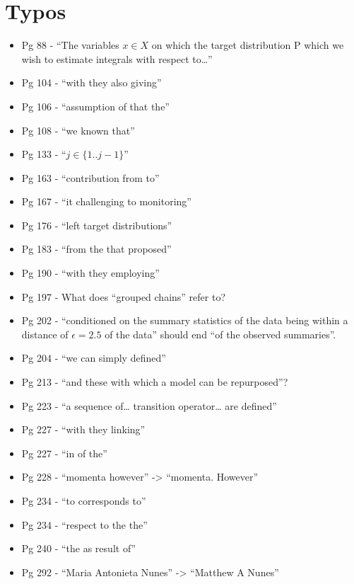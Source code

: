 \documentclass[]{article}
\providecommand{\tightlist}{%
  \setlength{\itemsep}{0pt}\setlength{\parskip}{0pt}}
\begin{document}
\section{Typos}\label{typos}

\begin{itemize}
\tightlist
\item
  Pg 88 - ``The variables \(x \in X\) on which the target distribution P
  which we wish to estimate integrals with respect to\ldots{}''
\item
  Pg 104 - ``with they also giving''
\item
  Pg 106 - ``assumption of that the''
\item
  Pg 108 - ``we known that''
\item
  Pg 133 - ``\(j \in \{1..j-1\}\)''
\item
  Pg 163 - ``contribution from to''
\item
  Pg 167 - ``it challenging to monitoring''
\item
  Pg 176 - ``left target distributions''
\item
  Pg 183 - ``from the that proposed''
\item
  Pg 190 - ``with they employing''
\item
  Pg 197 - What does ``grouped chains'' refer to?
\item
  Pg 202 - ``conditioned on the summary statistics of the data being
  within a distance of \(\epsilon=2.5\) of the data'' should end ``of
  the observed summaries''.
\item
  Pg 204 - ``we can simply defined''
\item
  Pg 213 - ``and these with which a model can be repurposed''?
\item
  Pg 223 - ``a sequence of\ldots{} transition operator\ldots{} are
  defined''
\item
  Pg 227 - ``with they linking''
\item
  Pg 227 - ``in of the''
\item
  Pg 228 - ``momenta however'' -\textgreater{} ``momenta. However''
\item
  Pg 234 - ``to corresponds to''
\item
  Pg 234 - ``respect to the the''
\item
  Pg 240 - ``the as result of''
\item
  Pg 292 - ``Maria Antonieta Nunes'' -\textgreater{} ``Matthew A Nunes''
\end{itemize}
\end{document}
